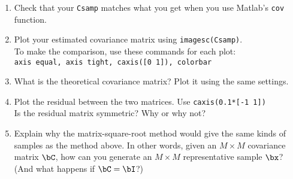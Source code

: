 \documentclass[11pt,titlepage,fleqn]{article}
\begin{document}
\begin{enumerate}
\item Check that your \verb+Csamp+ matches what you get when you use Matlab's \verb+cov+ function.

\item Plot your estimated covariance matrix using \verb+imagesc(Csamp)+. \\
To make the comparison, use these commands for each plot: \\
\verb+axis equal, axis tight, caxis([0 1]), colorbar+

\item What is the theoretical covariance matrix? Plot it using the same settings.

\item Plot the residual between the two matrices. Use \verb+caxis(0.1*[-1 1])+ \\
Is the residual matrix symmetric? Why or why not?

\item Explain why the matrix-square-root method would give the same kinds of samples as the method above. In other words, given an $M \times M$ covariance matrix $\bC$, how can you generate an $M \times M$ representative sample $\bx$? (And what happens if $\bC = \bI$?)

\end{enumerate}

\end{document}
